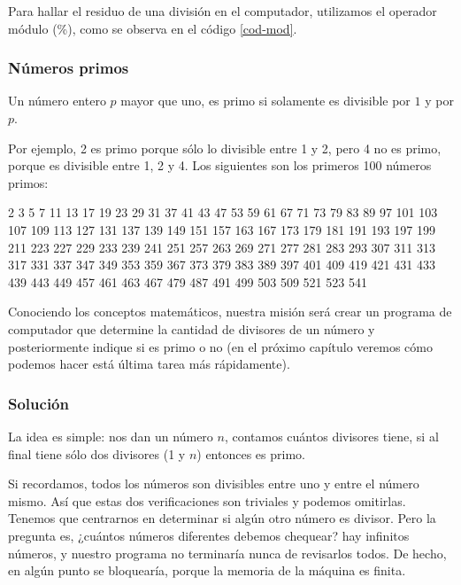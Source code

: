 Para hallar el residuo de una división en el computador, utilizamos el operador módulo (\%), como se observa en el código \ref{cod-mod}. \\





\subsubsection{Números primos}

Un número entero $p$ mayor que uno, es  primo si solamente es divisible por $1$ y por $p$.  

Por ejemplo, 2 es primo porque sólo lo divisible entre 1 y 2, pero 4 no es primo, porque es divisible entre 1, 2 y 4. Los siguientes son los primeros 100 números primos:

2 3 5 7 11 13 17 19 23 29 31 37 41 43 47 53 59 61 67 71 73 79 83 89 97 101 103 107 109 113 127 131 137 139 149 151 157 163 167 173 179 181 191 193 197 199 211 223 227 229 233 239 241 251 257 263 269 271 277 281 283 293 307 311 313 317 331 337 347 349 353 359 367 373 379 383 389 397 401 409 419 421 431 433 439 443 449 457 461 463 467 479 487 491 499 503 509 521 523 541 

Conociendo los conceptos matemáticos, nuestra misión será crear un programa de computador que determine la cantidad de divisores de un número y posteriormente indique si es primo o no (en el próximo capítulo veremos cómo podemos hacer está última tarea más rápidamente).

\subsubsection{Solución}

La idea es simple: nos dan un número $n$, contamos cuántos divisores tiene, si al final tiene sólo dos divisores (1 y $n$) entonces es primo.

Si recordamos, todos los números son divisibles entre uno y entre el número mismo. Así que estas dos verificaciones son triviales y podemos omitirlas. Tenemos que centrarnos en determinar si algún otro número es divisor. Pero la pregunta es, ¿cuántos números diferentes debemos chequear? hay infinitos números, y nuestro programa no terminaría nunca de revisarlos todos. De hecho, en algún punto se bloquearía, porque la memoria de la máquina es finita. 

